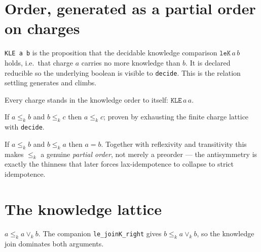 \section{Order, generated as a partial order on charges}

\begin{definition}\label{def:kle}\leanok{}
\texttt{KLE a b} is the proposition that the decidable knowledge comparison
$\texttt{leK}\,a\,b$ holds, i.e.\ that charge $a$ carries no more knowledge than
$b$. It is declared reducible so the underlying boolean is visible to
\texttt{decide}. This is the relation settling generates and climbs.
\end{definition}

\begin{theorem}[$\le_k$ is reflexive]\label{thm:kle-refl}\leanok{}
Every charge stands in the knowledge order to itself: $\texttt{KLE}\,a\,a$.
\end{theorem}

\begin{theorem}[$\le_k$ is transitive]\label{thm:kle-trans}\leanok{}
If $a \le_k b$ and $b \le_k c$ then $a \le_k c$; proven by exhausting the
finite charge lattice with \texttt{decide}.
\end{theorem}

\begin{theorem}[$\le_k$ is antisymmetric]\label{thm:kle-antisymm}\leanok{}
If $a \le_k b$ and $b \le_k a$ then $a = b$. Together with reflexivity and
transitivity this makes $\le_k$ a genuine \emph{partial order}, not merely a
preorder --- the antisymmetry is exactly the thinness that later forces
lax-idempotence to collapse to strict idempotence.
\end{theorem}

\section{The knowledge lattice}

\begin{theorem}\label{thm:le-joink}\leanok{}
$a \le_k a \vee_k b$. The companion \texttt{le\_joinK\_right} gives
$b \le_k a \vee_k b$, so the knowledge join dominates both arguments.
\end{theorem}


